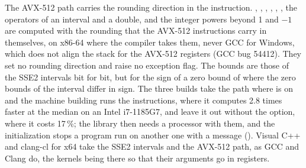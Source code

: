 \documentclass[12pt,a4paper,twoside,openright]{book}
\begin{document}
\medskip
The AVX-512 path carries the rounding direction in the
instruction.\newinvfive{} , , ,
, , , the operators of an interval and
a double, and the integer powers beyond 1 and $-1$ are computed with the
rounding that the AVX-512 instructions carry in themselves, on x86-64 where
the compiler takes them, never GCC for Windows, which does not align the
stack for the AVX-512 registers (GCC bug 54412). They set no rounding
direction and raise no exception flag. The bounds are those of the SSE2
intervals bit for bit, but for the sign of a zero bound of 
where the zero bounds of the interval differ in sign. The three builds take
the path where  is on and the machine building
runs the instructions, where it computes 2.8 times faster at the median on an
Intel i7-1185G7, and leave it out without the option, where it costs 17\,\%;
the library then needs a processor with them, and the initialization stops a
program run on another one with a message (). Visual C++
and clang-cl for x64 take the SSE2 intervals and the AVX-512 path, as GCC and
Clang do, the kernels being  there so that their
 arguments go in registers.
\end{document}
